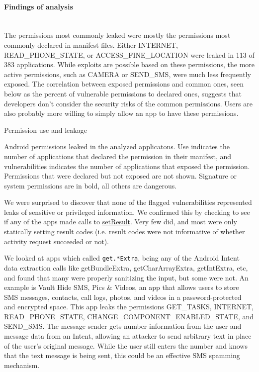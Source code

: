 \documentclass[12pt,a4paper]{article}
\begin{document}
\paragraph{Findings of analysis} ~\\
The permissions most commonly leaked were mostly the permissions most commonly
declared in manifest files. Either INTERNET, READ\_PHONE\_STATE, or
ACCESS\_FINE\_LOCATION were leaked in 113 of 383 applications. While exploits
are possible based on these permissions, the more active permissions, such as
CAMERA or SEND\_SMS, were much less frequently exposed. The correlation between
exposed permissions and common ones, seen below as the percent of vulnerable
permissions to declared ones, suggests that developers don't consider the
security risks of the common permissions. Users are also probably more willing
to simply allow an app to have these permissions.
\begin{table}
\caption{Permission use and leakage}

\caption*{Android permissions leaked in the analyzed applicatons. Use indicates
  the number of applications that declared the permission in their
  manifest, and vulnerabilities indicates the number of applications that
  exposed the permission.  Permissions that were declared but not exposed
  are not shown. Signature or system permissions are in bold, all others
  are dangerous.}
\end{table}

We were surprised to discover that none of the flagged vulnerabilities
represented leaks of sensitive or privileged information. We confirmed this by
checking to see if any of the apps made calls to
\href{https://developer.android.com/reference/android/app/Activity.html#setResult\%28int\%29}{setResult}. Very
few did, and most were only statically setting result codes (i.e. result codes
were not informative of whether activity request succeeded or not).

We looked at apps which called \texttt{get.*Extra}, being any of the Android
Intent data extraction calls like getBundleExtra, getCharArrayExtra,
getIntExtra, etc, and found that many were properly sanitizing the input, but
some were not. An example is Vault Hide SMS, Pics \& Videos, an app that allows
users to store SMS messages, contacts, call logs, photos, and videos in a
password-protected and encrypted space. This app leaks the permissions
GET\_TASKS, INTERNET, READ\_PHONE\_STATE, CHANGE\_COMPONENT\_ENABLED\_STATE, and
SEND\_SMS. The message sender gets number information from the user and message
data from an Intent, allowing an attacker to send arbitrary text in place of the
user's original message. While the user still enters the number and knows that
the text message is being sent, this could be an effective SMS spamming
mechanism.
\end{document}
